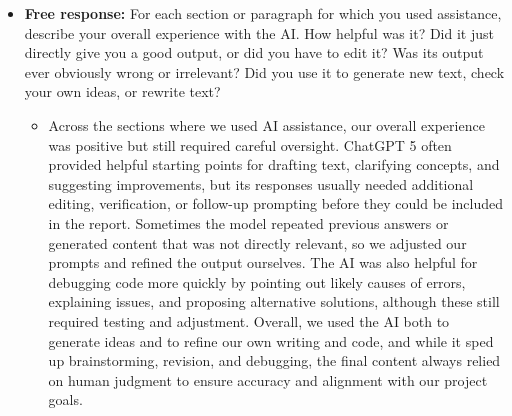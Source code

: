 \documentclass[11pt,a4paper]{article}
\begin{document}
\begin{itemize}
    \item{\textbf{Free response:} For each section or paragraph for which you used assistance, describe your overall experience with the AI. How helpful was it? Did it just directly give you a good output, or did you have to edit it? Was its output ever obviously wrong or irrelevant? Did you use it to generate new text, check your own ideas, or rewrite text?}
    \begin{itemize}
        \item{Across the sections where we used AI assistance, our overall experience was positive but still required careful oversight. ChatGPT 5 often provided helpful starting points for drafting text, clarifying concepts, and suggesting improvements, but its responses usually needed additional editing, verification, or follow-up prompting before they could be included in the report. Sometimes the model repeated previous answers or generated content that was not directly relevant, so we adjusted our prompts and refined the output ourselves. The AI was also helpful for debugging code more quickly by pointing out likely causes of errors, explaining issues, and proposing alternative solutions, although these still required testing and adjustment. Overall, we used the AI both to generate ideas and to refine our own writing and code, and while it sped up brainstorming, revision, and debugging, the final content always relied on human judgment to ensure accuracy and alignment with our project goals.}
    \end{itemize}
\end{itemize}

\newpage
\footnotesize

\end{document}
